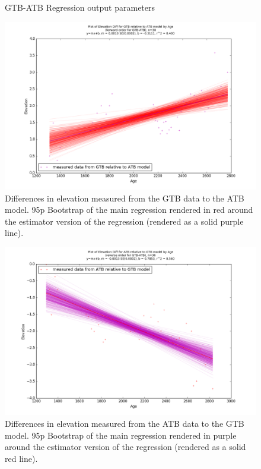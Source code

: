 \begin{figure}[H]
	\begin{flushleft}
	\end{flushleft}
	\caption{GTB-ATB Regression output parameters}
	\label{fig:GTBxATB_regression}
\end{figure}

\newpage

\begin{figure}[H]
	\includegraphics[width=1.7\linewidth, angle=270 ]{data/bothNonZero/withinSeventyFivePercent/gias/theGIA_GTB_relative_to_ATB.png}
	\caption{Differences in elevation measured from the GTB data to the ATB model. 95p Bootstrap of the main regression rendered in red around the estimator version of the regression (rendered as a solid purple line).}
	\label{fig:gias_GTBxATB}
\end{figure}
\newpage


\begin{figure}[H]
	\includegraphics[width=1.7\linewidth, angle=270 ]{data/bothNonZero/withinSeventyFivePercent/gias/theGIA_ATB_relative_to_GTB.png}
	\caption{Differences in elevation measured from the ATB data to the GTB model. 95p Bootstrap of the main regression rendered in purple around the estimator version of the regression (rendered as a solid red line).}
	\label{fig:gias_ATBxGTB}
\end{figure}
\newpage








